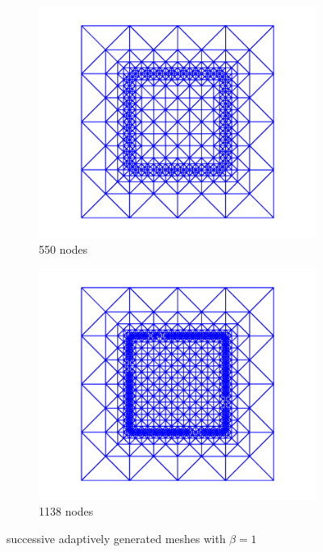 \documentclass[11p]{article}
\begin{document}
\begin{figure}[H]
		\begin{subfigure}{0.5\linewidth}
			\includegraphics[width=\linewidth]{figures/discSet/adaptTriangulation/adaptTriangulationLevel6}
			\caption{550 nodes}
		\end{subfigure}\hfill
		\begin{subfigure}{0.5\linewidth}
			\includegraphics[width=\linewidth]{figures/discSet/adaptTriangulation/adaptTriangulationLevel7}
			\caption{1138 nodes}
		\end{subfigure}
		\caption{successive adaptively generated meshes with $\beta = 1$}
	\end{figure}
\end{document}
